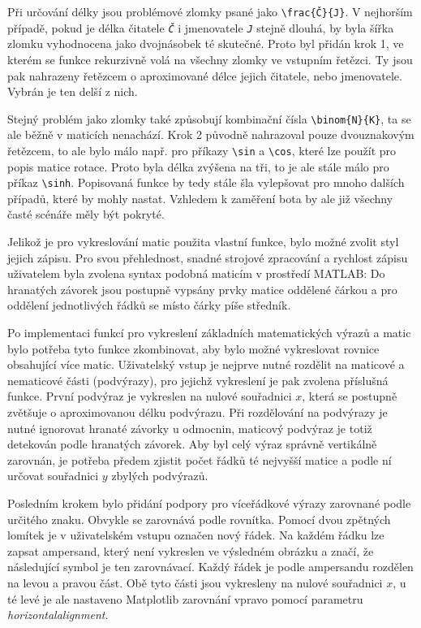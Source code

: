 \documentclass[FM]{tulthesis}
\begin{document}
	Při určování délky jsou problémové zlomky psané jako \verb|\frac{Č}{J}|. V nejhorším případě, pokud je délka čitatele \textit{\texttt{Č}} i jmenovatele \textit{\texttt{J}} stejně dlouhá, by byla šířka zlomku vyhodnocena jako dvojnásobek té skutečné. Proto byl přidán krok 1, ve kterém se funkce rekurzivně volá na všechny zlomky ve vstupním řetězci. Ty jsou pak nahrazeny řetězcem o aproximované délce jejich čitatele, nebo jmenovatele. Vybrán je ten delší z nich.

	Stejný problém jako zlomky také způsobují kombinační čísla \verb|\binom{N}{K}|, ta se ale běžně v maticích nenachází. Krok 2 původně nahrazoval pouze dvouznakovým řetězcem, to ale bylo málo např. pro příkazy \verb|\sin| a \verb|\cos|, které lze použít pro popis matice rotace. Proto byla délka zvýšena na tři, to je ale stále málo pro příkaz \verb|\sinh|. Popisovaná funkce by tedy stále šla vylepšovat pro mnoho dalších případů, které by mohly nastat. Vzhledem k zaměření bota by ale již všechny časté scénáře měly být pokryté.

	Jelikož je pro vykreslování matic použita vlastní funkce, bylo možné zvolit styl jejich zápisu. Pro svou přehlednost, snadné strojové zpracování a rychlost zápisu uživatelem byla zvolena syntax podobná maticím v prostředí MATLAB: Do hranatých závorek jsou postupně vypsány prvky matice oddělené čárkou a pro oddělení jednotlivých řádků se místo čárky píše středník.

	Po implementaci funkcí pro vykreslení základních matematických výrazů a matic bylo potřeba tyto funkce zkombinovat, aby bylo možné vykreslovat rovnice obsahující více matic. Uživatelský vstup je nejprve nutné rozdělit na maticové a nematicové části (podvýrazy), pro jejichž vykreslení je pak zvolena příslušná funkce. První podvýraz je vykreslen na nulové souřadnici $x$, která se postupně zvětšuje o aproximovanou délku podvýrazu. Při rozdělování na podvýrazy je nutné ignorovat hranaté závorky u odmocnin, maticový podvýraz je totiž detekován podle hranatých závorek. Aby byl celý výraz správně vertikálně zarovnán, je potřeba předem zjistit počet řádků té nejvyšší matice a podle ní určovat souřadnici $y$ zbylých podvýrazů.
	
	Posledním krokem bylo přidání podpory pro víceřádkové výrazy zarovnané podle určitého znaku. Obvykle se zarovnává podle rovnítka. Pomocí dvou zpětných lomítek je v uživatelském vstupu označen nový řádek. Na každém řádku lze zapsat ampersand, který není vykreslen ve výsledném obrázku a značí, že následující symbol je ten zarovnávací. Každý řádek je podle ampersandu rozdělen na levou a pravou část. Obě tyto části jsou vykresleny na nulové souřadnici $x$, u té levé je ale nastaveno Matplotlib zarovnání vpravo pomocí parametru \textit{horizontalalignment}.
	
\end{document}
